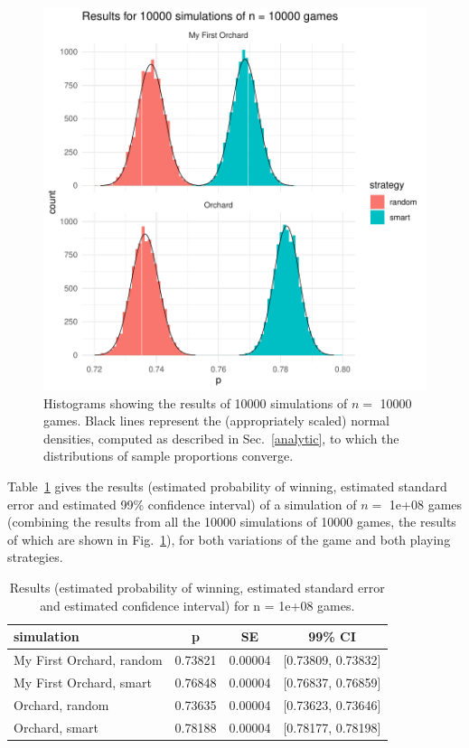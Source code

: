 \documentclass{article}
\begin{document}
\begin{figure}[h]
  \begin{center}
\includegraphics{orchard-003}
    \caption{Histograms showing the results of 10000 simulations of \(n = \) 10000 games. Black lines represent the (appropriately scaled) normal densities, computed as described in Sec.~\ref{analytic}, to which the distributions of sample proportions converge.}
    \label{hist}
  \end{center}
\end{figure}

Table~\ref{table} gives the results (estimated probability of winning, estimated standard error and estimated 99\% confidence interval) of a simulation of \(n = \) 1e+08 games (combining the results from all the 10000 simulations of 10000 games, the results of which are shown in Fig.~\ref{hist}), for both variations of the game and both playing strategies.

\begin{table}[h]
\centering
\begin{tabular}{l|ccc}
 simulation & p & SE & 99\% CI \\ 
  \hline
My First Orchard, random & 0.73821 & 0.00004 & [0.73809, 0.73832] \\ 
  My First Orchard, smart & 0.76848 & 0.00004 & [0.76837, 0.76859] \\ 
  Orchard, random & 0.73635 & 0.00004 & [0.73623, 0.73646] \\ 
  Orchard, smart & 0.78188 & 0.00004 & [0.78177, 0.78198] \\ 
  \end{tabular}
\caption{Results (estimated probability of winning, estimated standard error and estimated confidence interval) for n = 1e+08 games.} 
\label{table}
\end{table}
\end{document}

